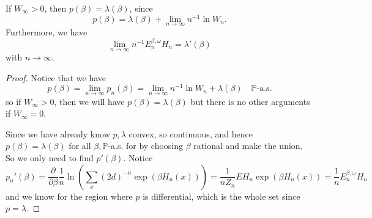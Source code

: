 \begin{proposition}
    If $W_{\infty} > 0$, then $p(\beta) = \lambda(\beta)$, since
    \[
    p(\beta) = \lambda(\beta) + \lim_{n\to\infty} n^{-1}\ln W_n.
    \]
    Furthermore, we have
    \[
    \lim_{n\to\infty} n^{-1}E_n^{\beta,\omega}H_n = \lambda'(\beta)
    \]
    with $n\to\infty$.
\end{proposition}
\begin{proof}
    Notice that we have
    \[p(\beta) = \lim_{n\to\infty} p_n(\beta) = \lim_{n\to\infty}n^{-1}\ln W_n + \lambda(\beta)\quad\mathbb{P}\text{-a.s.}\]
    so if $W_{\infty} > 0$, then we will have $p(\beta) = \lambda(\beta)$ but there is no other arguments if $W_{\infty} = 0$.\par
    Since we have already know $p,\lambda$ convex, so continuous, and hence $p(\beta) = \lambda(\beta)$ for all $\beta, \mathbb{P}$-a.s. for by choosing $\beta$ rational and make the union. So we only need to find $p'(\beta)$. Notice
    \[
    p_n'(\beta) = \dfrac{\partial}{\partial \beta} \dfrac{1}{n}\ln(\sum\limits_{x} (2d)^{-n} \exp(\beta H_n(x))) = \dfrac{1}{nZ_n}EH_n \exp(\beta H_n(x)) = \dfrac{1}{n}E_{n}^{\beta,\omega}H_n
    \]
    and we know for the region where $p$ is differential, which is the whole set since $p = \lambda$.
\end{proof}

